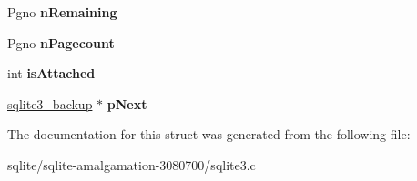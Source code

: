 \begin{DoxyCompactItemize}
\item 
\hypertarget{structsqlite3__backup_a4287faa23d4534e8a33915740604d1e1}{Pgno {\bfseries n\+Remaining}}\label{structsqlite3__backup_a4287faa23d4534e8a33915740604d1e1}

\item 
\hypertarget{structsqlite3__backup_a98599d5a3a13173a6a126242d1fbbaa8}{Pgno {\bfseries n\+Pagecount}}\label{structsqlite3__backup_a98599d5a3a13173a6a126242d1fbbaa8}

\item 
\hypertarget{structsqlite3__backup_af515f0d9265847d820cbaad41cef78ae}{int {\bfseries is\+Attached}}\label{structsqlite3__backup_af515f0d9265847d820cbaad41cef78ae}

\item 
\hypertarget{structsqlite3__backup_a3a87332e045fe4a477fe262409c6011a}{\hyperlink{structsqlite3__backup}{sqlite3\+\_\+backup} $\ast$ {\bfseries p\+Next}}\label{structsqlite3__backup_a3a87332e045fe4a477fe262409c6011a}

\end{DoxyCompactItemize}


The documentation for this struct was generated from the following file\+:\begin{DoxyCompactItemize}
\item 
sqlite/sqlite-\/amalgamation-\/3080700/sqlite3.\+c\end{DoxyCompactItemize}
